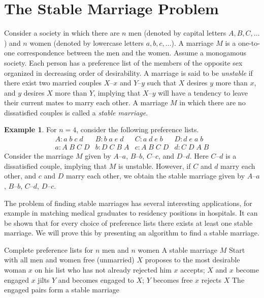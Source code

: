 \documentclass[twoside,12pt]{book}
\theoremstyle{plain}
\theoremstyle{definition}
\newtheorem{example}[theorem]{Example}
\theoremstyle{remark}
\begin{document}
\section{The Stable Marriage Problem}
\label{sec:stable-marriage}

Consider a society in which there are $n$ men (denoted by capital letters $A, B, C, \ldots$) and $n$ women (denoted by lowercase letters $a, b, c, \ldots$). A marriage $M$ is a one-to-one correspondence between the men and the women. Assume a monogamous society. Each person has a preference list of the members of the opposite sex organized in decreasing order of desirability. A marriage is said to be \emph{unstable} if there exist two married couples $X$--$x$ and $Y$--$y$ such that $X$ desires $y$ more than $x$, and $y$ desires $X$ more than $Y$, implying that $X$--$y$ will have a tendency to leave their current mates to marry each other. A marriage $M$ in which there are no dissatisfied couples is called a \emph{stable marriage}.

\begin{example}
For $n = 4$, consider the following preference lists.
\[
\begin{array}{llll}
A: a\; b\; c\; d & B: b\; a\; e\; d & C: a\; d\; e\; b & D: d\; e\; a\; b \\
a: A\; B\; C\; D & b: D\; C\; B\; A & c: A\; B\; C\; D & d: C\; D\; A\; B
\end{array}
\]
Consider the marriage $M$ given by $A$--$a$, $B$--$b$, $C$--$c$, and $D$--$d$. Here $C$--$d$ is a dissatisfied couple, implying that $M$ is unstable. However, if $C$ and $d$ marry each other, and $c$ and $D$ marry each other, we obtain the stable marriage given by $A$--$a$, $B$--$b$, $C$--$d$, $D$--$c$.
\end{example}

The problem of finding stable marriages has several interesting applications, for example in matching medical graduates to residency positions in hospitals. It can be shown that for every choice of preference lists there exists at least one stable marriage. We will prove this by presenting an algorithm to find a stable marriage.

\begin{algorithm}[H]
\caption{The Proposal Algorithm (Gale--Shapley)}
\label{alg:proposal}
\begin{algorithmic}[1]
\Require Complete preference lists for $n$ men and $n$ women
\Ensure A stable marriage $M$
\State Start with all men and women free (unmarried)
    \State $X$ proposes to the most desirable woman $x$ on his list who has not already rejected him
        \State $x$ accepts; $X$ and $x$ become engaged
        \State $x$ jilts $Y$ and becomes engaged to $X$; $Y$ becomes free
    \Else
        \State $x$ rejects $X$
    \EndIf
\EndWhile
\State The engaged pairs form a stable marriage
\end{algorithmic}
\end{algorithm}
\end{document}
